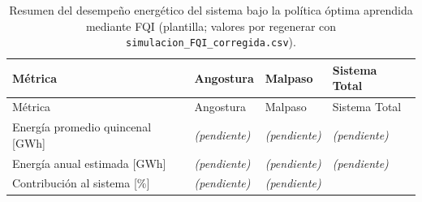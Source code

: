 \documentclass[
  letterpaper,
  DIV=11,
  numbers=noendperiod]{scrreprt}
\theoremstyle{definition}
\theoremstyle{remark}
\begin{document}
\begin{longtable}[]{@{}
  >{\raggedright\arraybackslash}p{}
  >{\raggedright\arraybackslash}p{}
  >{\raggedright\arraybackslash}p{}
  >{\raggedright\arraybackslash}p{}@{}}
\caption{Resumen del desempeño energético del sistema bajo la política
óptima aprendida mediante FQI (plantilla; valores por regenerar con
\protect\texttt{simulacion\_FQI\_corregida.csv}).}\label{tbl-desempeno-energetico}\tabularnewline
\toprule\noalign{}
\begin{minipage}[b]{\linewidth}\raggedright
Métrica
\end{minipage} & \begin{minipage}[b]{\linewidth}\raggedright
Angostura
\end{minipage} & \begin{minipage}[b]{\linewidth}\raggedright
Malpaso
\end{minipage} & \begin{minipage}[b]{\linewidth}\raggedright
Sistema Total
\end{minipage} \\
\midrule\noalign{}
\endfirsthead
\toprule\noalign{}
\begin{minipage}[b]{\linewidth}\raggedright
Métrica
\end{minipage} & \begin{minipage}[b]{\linewidth}\raggedright
Angostura
\end{minipage} & \begin{minipage}[b]{\linewidth}\raggedright
Malpaso
\end{minipage} & \begin{minipage}[b]{\linewidth}\raggedright
Sistema Total
\end{minipage} \\
\midrule\noalign{}
\endhead
\bottomrule\noalign{}
\endlastfoot
Energía promedio quincenal {[}GWh{]} & \emph{(pendiente)} &
\emph{(pendiente)} & \emph{(pendiente)} \\
Energía anual estimada {[}GWh{]} & \emph{(pendiente)} &
\emph{(pendiente)} & \emph{(pendiente)} \\
Contribución al sistema {[}\%{]} & \emph{(pendiente)} &
\emph{(pendiente)} & 100.0 \\
\end{longtable}
\end{document}
